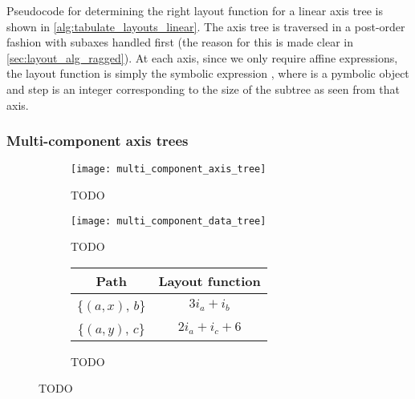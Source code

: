 \documentclass[thesis]{subfiles}
\begin{document}
Pseudocode for determining the right layout function for a linear axis tree is shown in \cref{alg:tabulate_layouts_linear}.
The axis tree is traversed in a post-order fashion with subaxes handled first (the reason for this is made clear in \cref{sec:layout_alg_ragged}).
At each axis, since we only require affine expressions, the layout function is simply the symbolic expression , where  is a pymbolic  object and step is an integer corresponding to the size of the subtree as seen from that axis.

\subsubsection{Multi-component axis trees}
\label{sec:layout_alg_multi_component}

\begin{figure}
  \centering
  \begin{subfigure}{.3\textwidth}
    \centering
    \texttt{[image: multi\_component\_axis\_tree]}
    \caption{TODO}
    \label{fig:multi_component_axis_tree}
  \end{subfigure}
  \begin{subfigure}{.5\textwidth}
    \centering
    \texttt{[image: multi\_component\_data\_tree]}
    \caption{TODO}
    \label{fig:multi_component_data_tree}
  \end{subfigure}

  \vspace{1em}

  \begin{subfigure}{\textwidth}
    \centering
    \begin{tabular}{|c|c|}
      \hline
      \textbf{Path} & \textbf{Layout function} \\
      \hline
      \{$(a, x)$, $b$\} & $3 i_a + i_b$ \\
      \hline
      \{$(a, y)$, $c$\} & $2 i_a + i_c + 6$ \\
      \hline
    \end{tabular}
    \caption{TODO}
    \label{fig:multi_component_layouts}
  \end{subfigure}
  \caption{TODO}
  \label{fig:multi_component_axis_tree_all}
\end{figure}
\end{document}
